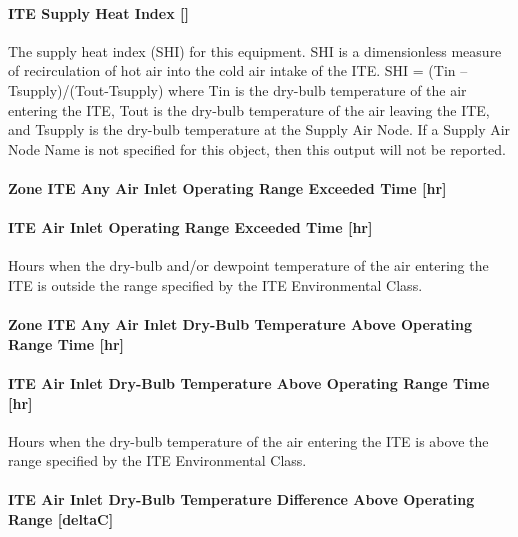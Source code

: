 \paragraph{ITE Supply Heat Index {[]}}\label{ite-supply-heat-index}

The supply heat index (SHI) for this equipment. SHI is a dimensionless measure of recirculation of hot air into the cold air intake of the ITE. SHI = (Tin -- Tsupply)/(Tout-Tsupply) where Tin is the dry-bulb temperature of the air entering the ITE, Tout is the dry-bulb temperature of the air leaving the ITE, and Tsupply is the dry-bulb temperature at the Supply Air Node. If a Supply Air Node Name is not specified for this object, then this output will not be reported.

\paragraph{Zone ITE Any Air Inlet Operating Range Exceeded Time {[}hr{]}}\label{zone-ite-any-air-inlet-operating-range-exceeded-time-hr}

\paragraph{ITE Air Inlet Operating Range Exceeded Time {[}hr{]}}\label{ite-air-inlet-operating-range-exceeded-time-hr}

Hours when the dry-bulb and/or dewpoint temperature of the air entering the ITE is outside the range specified by the ITE Environmental Class.

\paragraph{Zone ITE Any Air Inlet Dry-Bulb Temperature Above Operating Range Time {[}hr{]}}\label{zone-ite-any-air-inlet-dry-bulb-temperature-above-operating-range-time-hr}

\paragraph{ITE Air Inlet Dry-Bulb Temperature Above Operating Range Time {[}hr{]}}\label{ite-air-inlet-dry-bulb-temperature-above-operating-range-time-hr}

Hours when the dry-bulb temperature of the air entering the ITE is above the range specified by the ITE Environmental Class.

\paragraph{ITE Air Inlet Dry-Bulb Temperature Difference Above Operating Range {[}deltaC{]}}\label{ite-air-inlet-dry-bulb-temperature-difference-above-operating-range-deltac}

